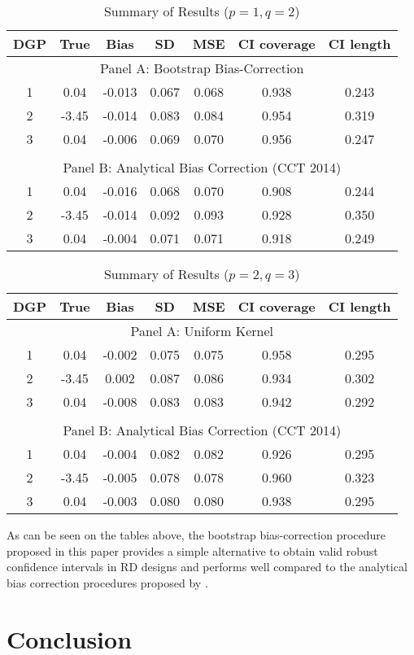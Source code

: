 \documentclass[12pt,fleqn]{article}
\begin{document}
\begin{table}[ht] \label{Tb1}
	\caption{Summary of Results ($p = 1, q = 2$)}
	\centering
	\begin{tabular}{ccccccc}
		\hline
		DGP & True & Bias & SD & MSE & CI coverage & CI length \\ 
		\hline
		\multicolumn{7}{c}{Panel A: Bootstrap Bias-Correction} \\
		1 & 0.04 & -0.013 & 0.067 & 0.068 & 0.938 & 0.243 \\ 
		2 & -3.45 & -0.014 & 0.083 & 0.084 & 0.954 & 0.319 \\ 
		3 & 0.04 & -0.006 & 0.069 & 0.070 & 0.956 & 0.247 \\ 
		&&&&&& \\
		\multicolumn{7}{c}{Panel B: Analytical Bias Correction (CCT 2014)} \\
		1 & 0.04 & -0.016 & 0.068 & 0.070 & 0.908 & 0.244 \\ 
		2 & -3.45 & -0.014 & 0.092 & 0.093 & 0.928 & 0.350 \\ 
		3 & 0.04 & -0.004 & 0.071 & 0.071 & 0.918 & 0.249 \\ 
		\hline
	\end{tabular}
\end{table}

\begin{table}[ht]\label{Tb2}
	\caption{Summary of Results ($p = 2, q = 3$)}
	\centering
	\begin{tabular}{ccccccc}
		\hline
		DGP & True & Bias & SD & MSE & CI coverage & CI length \\ 
		\hline
		\multicolumn{7}{c}{Panel A: Uniform Kernel} \\
		1 & 0.04 & -0.002 & 0.075 & 0.075 & 0.958 & 0.295 \\ 
		2 & -3.45 & 0.002 & 0.087 & 0.086 & 0.934 & 0.302 \\ 
		3 & 0.04 & -0.008 & 0.083 & 0.083 & 0.942 & 0.292 \\ 
		&&&&&& \\
		\multicolumn{7}{c}{Panel B: Analytical Bias Correction (CCT 2014)} \\
		1 & 0.04 & -0.004 & 0.082 & 0.082 & 0.926 & 0.295 \\ 		
		2 & -3.45 & -0.005 & 0.078 & 0.078 & 0.960 & 0.323 \\ 		
		3 & 0.04 & -0.003 & 0.080 & 0.080 & 0.938 & 0.295 \\ 
		\hline
	\end{tabular}
\end{table}

As can be seen on the tables above, the bootstrap bias-correction procedure
proposed in this paper provides a simple alternative to obtain valid robust
confidence intervals in RD designs and performs well compared to the analytical 
bias correction procedures proposed by \cite{calonico2014}.

\section{Conclusion}\label{conclusion}

\clearpage


\end{document}
